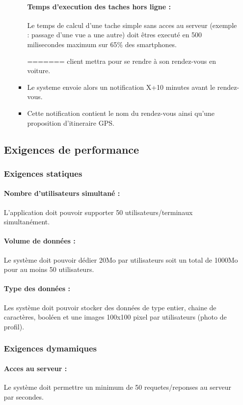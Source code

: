 \documentclass{article}
\begin{document}
\begin{itemize}
\begin{itemize}
\begin{itemize}
\paragraph{Temps d'execution des taches hors ligne :}
Le temps de calcul d'une tache simple sans acces au serveur (exemple : passage d'une vue a
une autre) doit êtres executé en 500 milisecondes maximum sur 65\% des
smartphones.

=======
      client mettra pour se rendre à son rendez-vous en voiture.
     \item Le systeme envoie alors un notification X+10 minutes avant
       le rendez-vous.
     \item Cette notification contient le nom du rendez-vous ainsi
       qu'une proposition d'itineraire GPS.
  \end{itemize}

\end{itemize}

\subsection{Exigences de performance}
\subsubsection{Exigences statiques}
\paragraph{Nombre d'utilisateurs simultané :}
L'application doit pouvoir supporter 50 utilisateurs/terminaux
simultanément.
\paragraph{Volume de données :}
Le système doit pouvoir dédier 20Mo par utilisateurs soit un total de
1000Mo pour au moins 50 utilisateurs.
\paragraph{Type des données :}
Les système doit pouvoir stocker des données de type entier, chaine de
caractères, booléen et une images 100x100 pixel par utilisateurs
(photo de profil).


\subsubsection{Exigences dymamiques}
\paragraph{Acces au serveur :}
Le système doit permettre un minimum de 50 requetes/reponses au serveur
par secondes.

\end{itemize}
\end{document}
